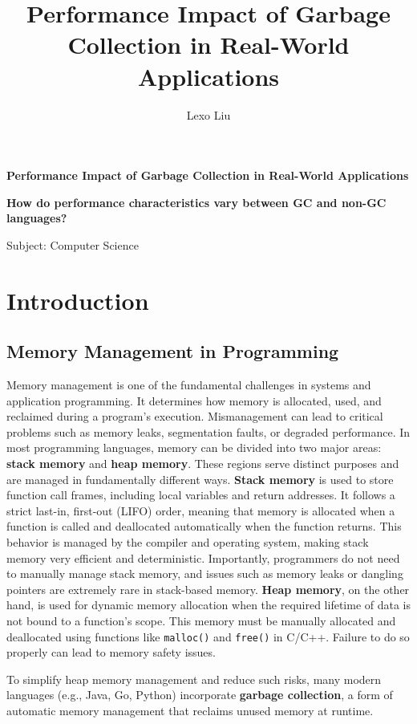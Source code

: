 \documentclass{article}
\title{Performance Impact of Garbage Collection in Real-World Applications}
\author{Lexo Liu}
\begin{document}
\begin{titlepage}
\centering
{\huge\bfseries Performance Impact of Garbage Collection in Real-World Applications\par}
\vspace{2cm}
{\large\bfseries How do performance characteristics vary between GC and non-GC languages?\par}
\vspace{1.5cm}
{\large Subject: Computer Science\par}
\end{titlepage}

\tableofcontents
\newpage

\section{Introduction}

\subsection{Memory Management in Programming}

Memory management is one of the fundamental challenges in systems and application programming. It determines how memory is allocated, used, and reclaimed during a program's execution. Mismanagement can lead to critical problems such as memory leaks, segmentation faults, or degraded performance. In most programming languages, memory can be divided into two major areas: \textbf{stack memory} and \textbf{heap memory}. These regions serve distinct purposes and are managed in fundamentally different ways. \textbf{Stack memory} is used to store function call frames, including local variables and return addresses. It follows a strict last-in, first-out (LIFO) order, meaning that memory is allocated when a function is called and deallocated automatically when the function returns. This behavior is managed by the compiler and operating system, making stack memory very efficient and deterministic. Importantly, programmers do not need to manually manage stack memory, and issues such as memory leaks or dangling pointers are extremely rare in stack-based memory. \textbf{Heap memory}, on the other hand, is used for dynamic memory allocation when the required lifetime of data is not bound to a function's scope. This memory must be manually allocated and deallocated using functions like \texttt{malloc()} and \texttt{free()} in C/C++. Failure to do so properly can lead to memory safety issues.

To simplify heap memory management and reduce such risks, many modern languages (e.g., Java, Go, Python) incorporate \textbf{garbage collection}, a form of automatic memory management that reclaims unused memory at runtime.
\end{document}
